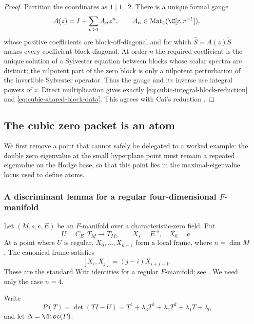 \begin{proof}
Partition the coordinates as \(1\mathbin{|}1\mathbin{|}2\).  There is a
unique formal gauge
\begin{equation}\label{eq:cubic-integral-block-gauge}
 A(z)=I+\sum_{n\ge1}A_nz^n,
 \qquad A_n\in\operatorname{Mat}_4(\C[r,r^{-1}]),
\end{equation}
whose positive coefficients are block-off-diagonal and for which
\(\widehat S=A(z)\widetilde S\) makes every coefficient block diagonal.  At
order \(n\) the required coefficient is the unique solution of a Sylvester
equation between blocks whose scalar spectra are distinct; the nilpotent
part of the zero block is only a nilpotent perturbation of the invertible
Sylvester operator.  Thus the gauge and its inverse use integral powers of
\(z\).  Direct multiplication gives exactly
\eqref{eq:cubic-integral-block-reduction} and
\eqref{eq:cubic-shared-block-data}.  This agrees with Cai's reduction
\cite[Section~3, pp.~4--5]{Cai}.
\end{proof}

\subsection{The cubic zero packet is an atom}

We first remove a point that cannot safely be delegated to a worked example:
the double zero eigenvalue at the small hyperplane point must remain a
repeated eigenvalue on the Hodge base, so that this point lies in the
maximal-eigenvalue locus used to define atoms.

\subsubsection{A discriminant lemma for a regular four-dimensional \texorpdfstring{$F$}{F}-manifold}

Let $(M,\circ,e,E)$ be an $F$-manifold over a characteristic-zero field.  Put
\[
  U=C_E:T_M\longrightarrow T_M,
  \qquad X_s=E^{\circ s},\quad X_0=e.
\]
At a point where $U$ is regular, $X_0,\dots,X_{n-1}$ form a local frame, where
$n=\dim M$.  The canonical frame satisfies
\begin{equation}\label{eq:witt}
  [X_i,X_j]=(j-i)X_{i+j-1}.
\end{equation}
These are the standard Witt identities for a regular $F$-manifold; see
\cite{DavidHertling}.  We need only the case $n=4$.

Write
\begin{equation}\label{eq:charpoly-lambda}
  P(T)=\det(TI-U)
  =T^4+\lambda_3T^3+\lambda_2T^2+\lambda_1T+\lambda_0
\end{equation}
and let $\Delta=\disc(P)$.

